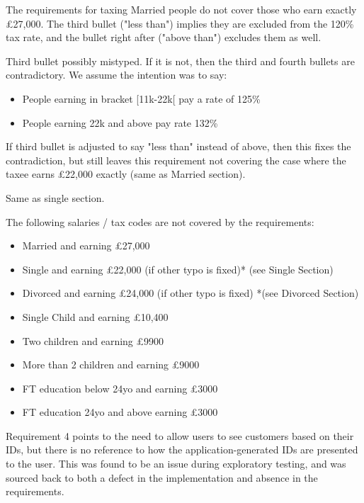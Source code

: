 The requirements for taxing Married people do not cover those who earn exactly £27,000. The third bullet ("less than") implies they are excluded from the 120\% tax rate, and the bullet right after ("above than") excludes them as well. 

Third bullet possibly mistyped. If it is not, then the third and fourth bullets are contradictory. We assume the intention was to say:  

\begin{itemize}
	\item People earning in bracket [11k-22k[ pay a rate of 125\%
	\item People earning 22k and above pay rate 132\%
\end{itemize}

If third bullet is adjusted to say "less than" instead of above, then this fixes the contradiction, but still leaves this requirement not covering the case where the taxee earns £22,000 exactly (same as Married section). 

Same as single section. 

The following salaries / tax codes are not covered by the requirements: 
\begin{itemize}
	\item Married and earning £27,000
	\item Single and earning £22,000 (if other typo is fixed)* (see Single Section)
	\item Divorced and earning £24,000 (if other typo is fixed) *(see Divorced Section)
	\item Single Child and earning £10,400
	\item Two children and earning £9900
	\item More than 2 children and earning £9000
	\item FT education below 24yo and earning £3000
	\item FT education 24yo and above earning £3000
\end{itemize}


Requirement 4 points to the need to allow users to see customers based on their IDs, but there is no reference to how the application-generated IDs are presented to the user. This was found to be an issue during exploratory testing, and was sourced back to both a defect in the implementation and absence in the requirements. 

